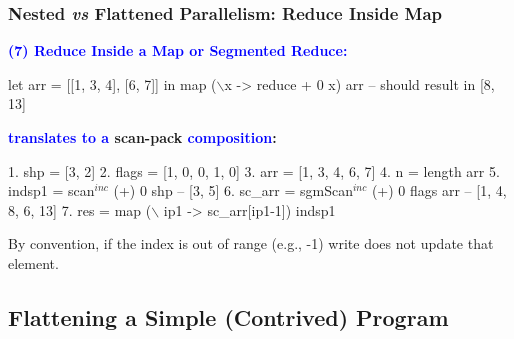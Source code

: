 \documentclass{beamer}
\newcommand{\blue}[1]{\textcolor{Blue}{{#1}}}
\renewcommand{\emph}[1]{\textcolor{structure}{#1}}
\newcommand{\emp}[1]{\textcolor{DikuRed}{ #1}}
\newcommand{\mymath}[1]{$ #1 $}
\newcommand{\myindu}[1]{^{#1}}
\begin{document}
\begin{frame}[fragile,t]
  \frametitle{Nested {\it vs} Flattened Parallelism: Reduce Inside Map}

\blue{\bf (7) Reduce Inside a Map or Segmented Reduce:} 

\begin{colorcode}[fontsize=\scriptsize]
let arr = [[1, 3, 4], [6, 7]] in
map (\mymath{\backslash}x -> reduce + 0 x) arr 
-- should result in [8, 13]
\end{colorcode}

\bigskip
\pause

\textbf{\blue{translates to a} \emp{scan-}\emph{pack} \blue{composition}:}
\bigskip

\begin{colorcode}[fontsize=\scriptsize]
1. shp    = [3, 2]
2. flags  = [1, 0, 0, 1, 0]
3. arr    = [1, 3, 4, 6, 7]
4. n      = length arr
5. indsp1 = scan\mymath{\myindu{inc}} (+) 0 shp          -- [3, 5] 
6. sc_arr = \emp{sgmScan\mymath{\myindu{inc}}} (+) 0 flags arr -- [1, 4, 8, 6, 13]
7. res    = map (\mymath{\backslash} ip1 -> sc_arr[ip1-1]) indsp1
\end{colorcode}

\alert{By convention, if the index is out of range (e.g., -1) write does not update that element.}

\end{frame}



\subsection{Flattening a Simple (Contrived) Program}

\begin{frame}[fragile]
	\tableofcontents[currentsubsection]
\end{frame}
\end{document}
